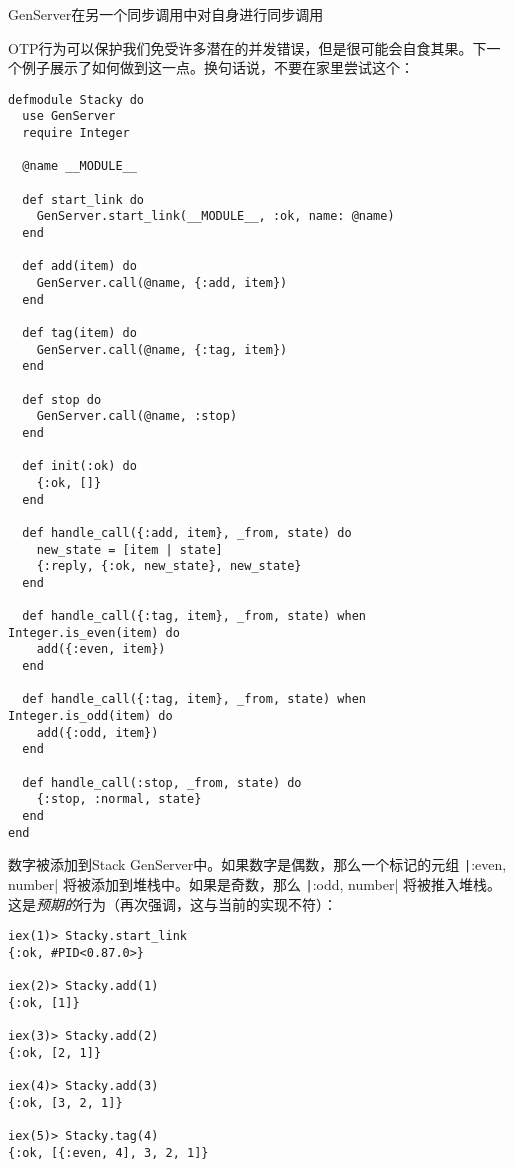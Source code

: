 \begin{example}{GenServer在另一个同步调用中对自身进行同步调用}

OTP行为可以保护我们免受许多潜在的并发错误，但是很可能会自食其果。下一个例子展示了如何做到这一点。换句话说，不要在家里尝试这个：

\begin{code}{}
\begin{verbatim}
defmodule Stacky do
  use GenServer
  require Integer

  @name __MODULE__

  def start_link do
    GenServer.start_link(__MODULE__, :ok, name: @name)
  end

  def add(item) do
    GenServer.call(@name, {:add, item})
  end

  def tag(item) do
    GenServer.call(@name, {:tag, item})
  end

  def stop do
    GenServer.call(@name, :stop)
  end

  def init(:ok) do
    {:ok, []}
  end

  def handle_call({:add, item}, _from, state) do
    new_state = [item | state]
    {:reply, {:ok, new_state}, new_state}
  end

  def handle_call({:tag, item}, _from, state) when Integer.is_even(item) do
    add({:even, item})
  end

  def handle_call({:tag, item}, _from, state) when Integer.is_odd(item) do
    add({:odd, item})
  end

  def handle_call(:stop, _from, state) do
    {:stop, :normal, state}
  end
end
\end{verbatim}
\end{code}

数字被添加到Stack GenServer中。如果数字是偶数，那么一个标记的元组
\texttt|{:even, number}|
将被添加到堆栈中。如果是奇数，那么
\texttt|{:odd, number}|
将被推入堆栈。这是\emph{预期的}行为（再次强调，这与当前的实现不符）：

\begin{code}{}
\begin{verbatim}
iex(1)> Stacky.start_link
{:ok, #PID<0.87.0>}

iex(2)> Stacky.add(1)
{:ok, [1]}

iex(3)> Stacky.add(2)
{:ok, [2, 1]}

iex(4)> Stacky.add(3)
{:ok, [3, 2, 1]}

iex(5)> Stacky.tag(4)
{:ok, [{:even, 4], 3, 2, 1]}


\end{verbatim}
\end{code}
\end{example}
